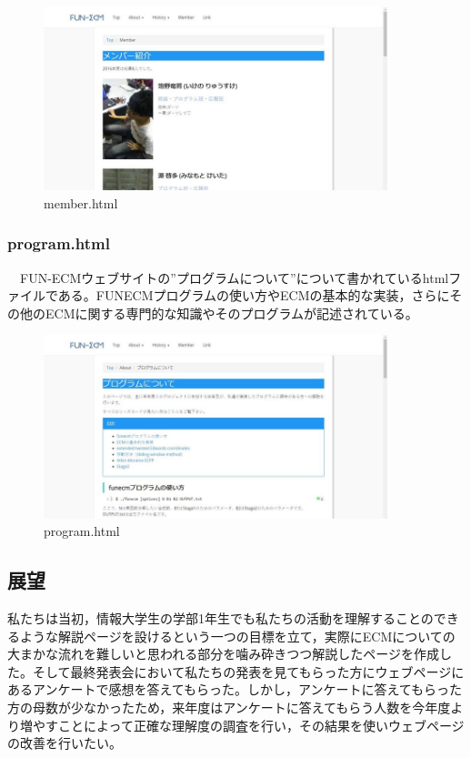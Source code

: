 \documentclass[openany,11pt,papersize]{jsbook}
\begin{document}
\begin{figure}[H]
  \begin{center} %
    \includegraphics[clip, width=10.0cm]{./figure/member.png}
    \caption{member.html} %
    \label{member} %
  \end{center}
\end{figure}

\subsubsection{program.html}
　FUN-ECMウェブサイトの”プログラムについて”について書かれているhtmlファイルである。FUNECMプログラムの使い方やECMの基本的な実装，さらにその他のECMに関する専門的な知識やそのプログラムが記述されている。

\begin{figure}[H]
  \begin{center} %
    \includegraphics[clip, width=10.0cm]{./figure/program.png}
    \caption{program.html} %
    \label{program} %
  \end{center}
\end{figure}


\subsection{展望}
私たちは当初，情報大学生の学部1年生でも私たちの活動を理解することのできるような解説ページを設けるという一つの目標を立て，実際にECMについての大まかな流れを難しいと思われる部分を噛み砕きつつ解説したページを作成した。そして最終発表会において私たちの発表を見てもらった方にウェブページにあるアンケートで感想を答えてもらった。しかし，アンケートに答えてもらった方の母数が少なかったため，来年度はアンケートに答えてもらう人数を今年度より増やすことによって正確な理解度の調査を行い，その結果を使いウェブページの改善を行いたい。
\end{document}
